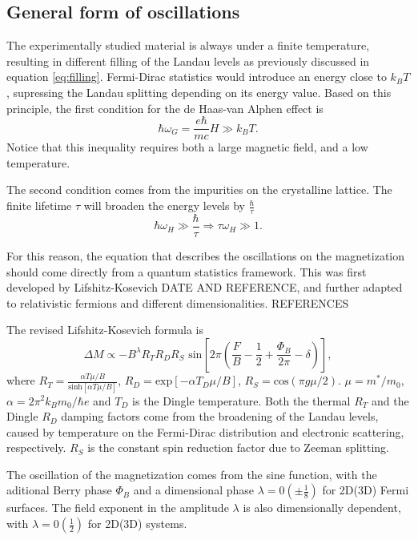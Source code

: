 \documentclass[prd,amsfonts,onecolumn,superscriptaddress,aps,nofootinbib,11pt]{revtex4}
\begin{document}
\subsection{General form of oscillations}

The experimentally studied material is always under a finite temperature, resulting in different filling of the Landau levels as previously discussed in equation \ref{eq:filling}. Fermi-Dirac statistics would introduce an energy close to $k_B T$, supressing the Landau splitting depending on its energy value. Based on this principle, the first condition for the de Haas-van Alphen effect is
\begin{equation}
    \hbar \omega_G = \frac{e \hbar}{mc} H \gg k_B T.
\end{equation}
Notice that this inequality requires both a large magnetic field, and a low temperature.




The second condition comes from the impurities on the crystalline lattice. The finite lifetime $\tau$ will broaden the energy levels by $\frac{\hbar}{\tau}$ 
\begin{equation}
    \hbar \omega_H \gg \frac{\hbar}{\tau} \Rightarrow \tau \omega_H \gg 1.
\end{equation}


For this reason, the equation that describes the oscillations on the magnetization should come directly from a quantum statistics framework. This was first developed by Lifshitz-Kosevich DATE AND REFERENCE, and further adapted to relativistic fermions and different dimensionalities. REFERENCES

The revised Lifshitz-Kosevich formula is
\begin{equation}
        \Delta M \propto -B^{\lambda} R_T   R_D   R_S  \text{ sin}\left[ 2\pi \left( \frac{F}{B} - \frac{1}{2} + \frac{\Phi_B}{2 \pi} - \delta  \right)      \right],
\end{equation}
where $R_T = \frac{\alpha T \mu / B  }{\text{sinh}[\alpha T \mu / B ]}$, $R_D =  \text{exp}[ -\alpha T_D \mu / B ]$, $R_S = \text{cos}(\pi g \mu /2 )$. $\mu = m^*/m_0$, $\alpha = 2 \pi^2 k_B m_0 / \hbar e$ and $T_D$ is the Dingle temperature. Both the thermal $R_T$ and the Dingle $R_D$ damping factors come from the broadening of the Landau levels, caused by temperature on the Fermi-Dirac distribution and electronic scattering, respectively. $R_S$ is the constant spin reduction factor due to Zeeman splitting. 

The oscillation of the magnetization comes from the sine function, with the aditional Berry phase $\Phi_B$ and a dimensional phase $\lambda = 0 (\pm \frac{1}{8})$ for 2D(3D) Fermi surfaces. The field exponent in the amplitude $\lambda$ is also dimensionally dependent, with $\lambda = 0 (\frac{1}{2})$ for 2D(3D) systems.
\end{document}
